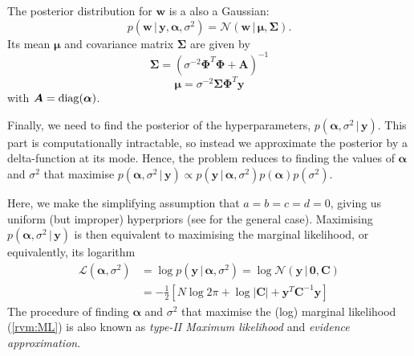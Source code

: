 The posterior distribution for $\bm w$ is a also a Gaussian:
\begin{equation}
  \label{rvm:posterior}
  p(\bm w\,|\,\bm y,\bm\alpha,\sigma^2) = \mathcal{N}(\bm w\,|\,\bm\mu,\bm\Sigma).
\end{equation}
Its mean $\bm \mu$ and covariance matrix $\bm\Sigma$ are given by
\begin{equation}
  \label{rvm:Sigma}
  \bm\Sigma = \left(\sigma^{-2}\bm\Phi^T\bm\Phi + \bm A\right)^{-1}
\end{equation}
\begin{equation}
  \label{rvm:mu}
  \bm\mu = \sigma^{-2}\bm\Sigma\bm\Phi^T\bm y
\end{equation}
with $\bm A = \operatorname*{diag}(\bm\alpha)$.

Finally, we need to find the posterior of the hyperparameters, $p(\bm\alpha,\sigma^2\,|\,\bm y)$.
This part is computationally intractable, so instead we approximate the posterior by a delta-function at its mode.
Hence, the problem reduces to finding the values of $\bm \alpha$ and $\sigma^2$ that maximise $p(\bm\alpha,\sigma^2\,|\,\bm y) \propto p(\bm y\,|\,\bm\alpha,\sigma^2)p(\bm\alpha)p(\sigma^2)$.

Here, we make the simplifying assumption that $a=b=c=d=0$, giving us uniform (but improper) hyperpriors (see \cite{tipping2001} for the general case).
Maximising $p(\bm\alpha,\sigma^2\,|\,\bm y)$ is then equivalent to maximising the marginal likelihood, or equivalently, its logarithm
\begin{equation}
  \label{rvm:ML}
  \begin{split}
    \mathcal{L}(\bm\alpha,\sigma^2) &= \log p(\bm y\,|\,\bm\alpha,\sigma^2) = \log \mathcal{N}(\bm y \,|\,\bm 0, \bm C)\\
    &=-\frac{1}{2}\left[N\log 2\pi + \log|\bm C| + \bm y^T\bm C^{-1} \bm y\right]
\end{split}    
\end{equation}
The procedure of finding $\bm\alpha$ and $\sigma^2$ that maximise the (log) marginal likelihood (\ref{rvm:ML}) is also known as \emph{type-II Maximum likelihood} and \emph{evidence approximation}.

